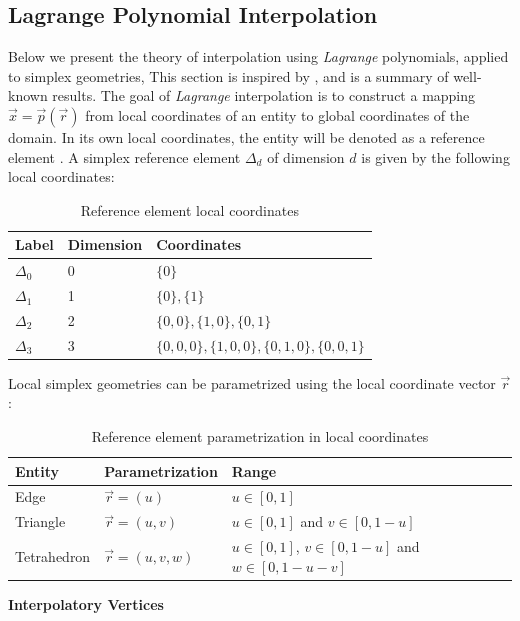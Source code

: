 \subsection{Lagrange Polynomial Interpolation}
\label{theory-lagrange}

Below we present the theory of interpolation using \textit{Lagrange} polynomials, applied to simplex geometries, This section is inspired by \cite{koshiba+2000, ilic+2003, berrut+2004}, and is a summary of well-known results. The goal of \textit{Lagrange} interpolation is to construct a mapping $\vec{x} = \vec{p}(\vec{r})$ from local coordinates of an entity to global coordinates of the domain. In its own local coordinates, the entity will be denoted as a reference element \citeDune{}. A simplex reference element $\Delta_d$ of dimension $d$ is given by the following local coordinates:
%
\begin{table}[H]
\centering
\begin{tabular}{l l l}
\hline
  Label & Dimension & Coordinates \\ \hline
  $\Delta_0$ & 0 & $\{ 0 \}$ \\
  $\Delta_1$ & 1 & $\{ 0\}, \{ 1\}$ \\
  $\Delta_2$ & 2 & $\{ 0, 0 \}, \{ 1, 0 \}, \{ 0, 1 \}$ \\
  $\Delta_3$ & 3 & $\{ 0, 0, 0 \}, \{ 1, 0, 0 \}, \{ 0, 1, 0 \}, \{ 0, 0, 1 \}$
\end{tabular}
\caption{Reference element local coordinates}
\label{table:lagrange:refelement}
\end{table}
%
\noindent
Local simplex geometries can be parametrized using the local coordinate vector $\vec{r}$:
%
\begin{table}[H]
\centering
\begin{tabular}{l l l}
\hline
  Entity      & Parametrization    & Range \\ \hline
  Edge        & $\vec{r}=(u)$      & $u \in [0,1]$ \\
  Triangle    & $\vec{r}=(u,v)$    & $u \in [0,1]$ and $v \in [0, 1-u]$ \\
  Tetrahedron & $\vec{r}=(u,v,w)$  & $u \in [0,1]$, $v \in [0, 1-u]$ and $w \in [0, 1-u-v]$
\end{tabular}
\caption{Reference element parametrization in local coordinates}
\label{table:lagrange:parametrization}
\end{table}



\noindent
\textbf{Interpolatory Vertices}

